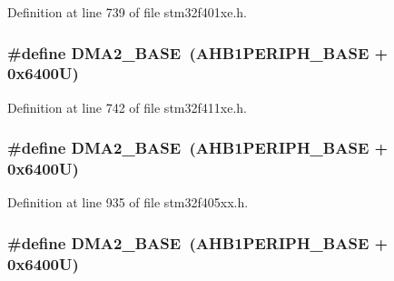 Definition at line 739 of file stm32f401xe.\+h.

\subsubsection[{\texorpdfstring{D\+M\+A2\+\_\+\+B\+A\+SE}{DMA2_BASE}}]{\setlength{\rightskip}{0pt plus 5cm}\#define D\+M\+A2\+\_\+\+B\+A\+SE~({\bf A\+H\+B1\+P\+E\+R\+I\+P\+H\+\_\+\+B\+A\+SE} + 0x6400\+U)}\hypertarget{group___peripheral__registers__structures_gab72a9ae145053ee13d1d491fb5c1df64}{}\label{group___peripheral__registers__structures_gab72a9ae145053ee13d1d491fb5c1df64}


Definition at line 742 of file stm32f411xe.\+h.

\subsubsection[{\texorpdfstring{D\+M\+A2\+\_\+\+B\+A\+SE}{DMA2_BASE}}]{\setlength{\rightskip}{0pt plus 5cm}\#define D\+M\+A2\+\_\+\+B\+A\+SE~({\bf A\+H\+B1\+P\+E\+R\+I\+P\+H\+\_\+\+B\+A\+SE} + 0x6400\+U)}\hypertarget{group___peripheral__registers__structures_gab72a9ae145053ee13d1d491fb5c1df64}{}\label{group___peripheral__registers__structures_gab72a9ae145053ee13d1d491fb5c1df64}


Definition at line 935 of file stm32f405xx.\+h.

\subsubsection[{\texorpdfstring{D\+M\+A2\+\_\+\+B\+A\+SE}{DMA2_BASE}}]{\setlength{\rightskip}{0pt plus 5cm}\#define D\+M\+A2\+\_\+\+B\+A\+SE~({\bf A\+H\+B1\+P\+E\+R\+I\+P\+H\+\_\+\+B\+A\+SE} + 0x6400\+U)}\hypertarget{group___peripheral__registers__structures_gab72a9ae145053ee13d1d491fb5c1df64}{}\label{group___peripheral__registers__structures_gab72a9ae145053ee13d1d491fb5c1df64}


